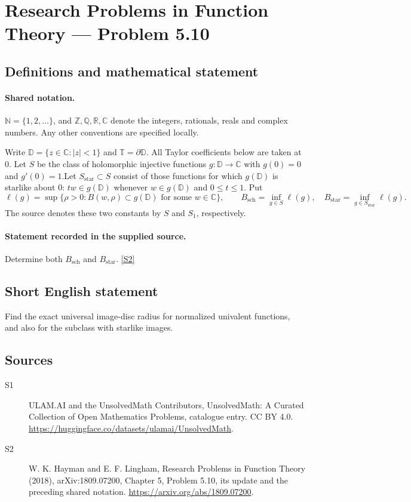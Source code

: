 \documentclass[11pt]{article}
\newcommand{\sref}[2]{\hyperlink{source:#1:#2}{[S#2]}}
\begin{document}
\section{Research Problems in Function Theory — Problem 5.10}\label{statement}

\subsection{Definitions and mathematical statement}

\paragraph{Shared notation.}$\mathbb N=\{1,2,\ldots\}$, and $\mathbb Z,\mathbb Q,\mathbb R,\mathbb C$ denote the integers, rationals, reals and complex numbers. Any other conventions are specified locally.


Write $\mathbb D=\{z\in\mathbb C:|z|<1\}$ and $\mathbb T=\partial\mathbb D$. All Taylor coefficients below are taken at $0$. Let $S$ be the class of holomorphic injective functions $g:\mathbb D\to\mathbb C$ with $g(0)=0$ and $g'(0)=1$.Let $S_{\mathrm{star}}\subset S$ consist of those functions for which $g(\mathbb D)$ is starlike about $0$: $tw\in g(\mathbb D)$ whenever $w\in g(\mathbb D)$ and $0\le t\le1$. Put
\[\ell(g)=\sup\{\rho>0:B(w,\rho)\subset g(\mathbb D)\text{ for some }w\in\mathbb C\},\qquad
B_{\mathrm{sch}}=\inf_{g\in S}\ell(g),\quad B_{\mathrm{star}}=\inf_{g\in S_{\mathrm{star}}}\ell(g).\]
The source denotes these two constants by $S$ and $S_1$, respectively.
\paragraph{Statement recorded in the supplied source.}
Determine both $B_{\mathrm{sch}}$ and $B_{\mathrm{star}}$. \sref{statement}{2}
\subsection{Short English statement}
Find the exact universal image-disc radius for normalized univalent functions, and also for the subclass with starlike images.
\subsection{Sources}
\begin{description}
\item[\hypertarget{source:statement:1}{S1}] ULAM.AI and the UnsolvedMath Contributors, UnsolvedMath: A Curated Collection of Open Mathematics Problems, catalogue entry. CC BY 4.0. \url{https://huggingface.co/datasets/ulamai/UnsolvedMath}.
\item[\hypertarget{source:statement:2}{S2}] W. K. Hayman and E. F. Lingham, Research Problems in Function Theory (2018), arXiv:1809.07200, Chapter 5, Problem 5.10, its update and the preceding shared notation. \url{https://arxiv.org/abs/1809.07200}.
\end{description}
\label{end:statement}
\end{document}
